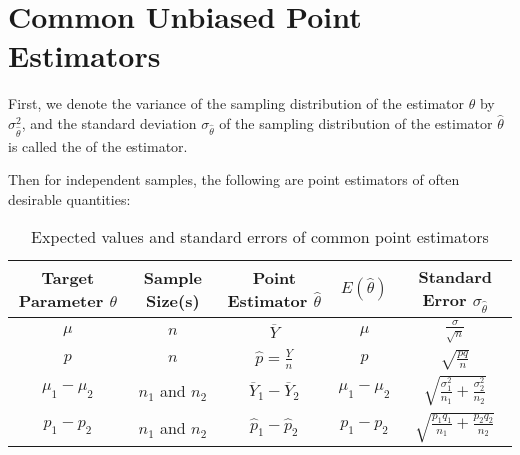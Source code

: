 \documentclass[12pt, a4paper, twoside, openright, titlepage]{book}
\begin{document}
\section{\textsection Common Unbiased Point Estimators}

First, we denote the variance of the sampling distribution of the estimator $\hat{\theta}$ by $\sigma_{\hat{\theta}}^2$, and the standard deviation $\sigma_{\hat{\theta}}$ of the sampling distribution of the estimator $\hat{\theta}$ is called the  of the estimator.

Then for independent samples, the following are point estimators of often desirable quantities:

\begin{table}[H]
    \centering
    \caption{Expected values and standard errors of common point estimators}
    \begin{tabular}{c|c|c|c|c}
        Target Parameter $\theta$ & Sample Size(s) & Point Estimator $\hat{\theta}$ & $E(\hat{\theta})$ & Standard Error $\sigma_{\hat{\theta}}$ \\ \hline
        $\mu$ & $n$ & $\overline{Y}$ & $\mu$ & $\frac{\sigma}{\sqrt{n}}$ \\
        $p$ & $n$ & $\hat{p} = \frac{Y}{n}$ & $p$ & $\sqrt{\frac{pq}{n}}$ \\
        $\mu_1 - \mu_2$ & $n_1$ and $n_2$ & $\overline{Y}_1 - \overline{Y}_2$ & $\mu_1 - \mu_2$ & $\sqrt{\frac{\sigma_1^2}{n_1} + \frac{\sigma_2^2}{n_2}}$ \\
        $p_1 - p_2$ & $n_1$ and $n_2$ & $\hat{p}_1 - \hat{p}_2$ & $p_1 - p_2$ & $\sqrt{\frac{p_1q_1}{n_1} + \frac{p_2q_2}{n_2}}$ \\
    \end{tabular}
\end{table}
\end{document}
